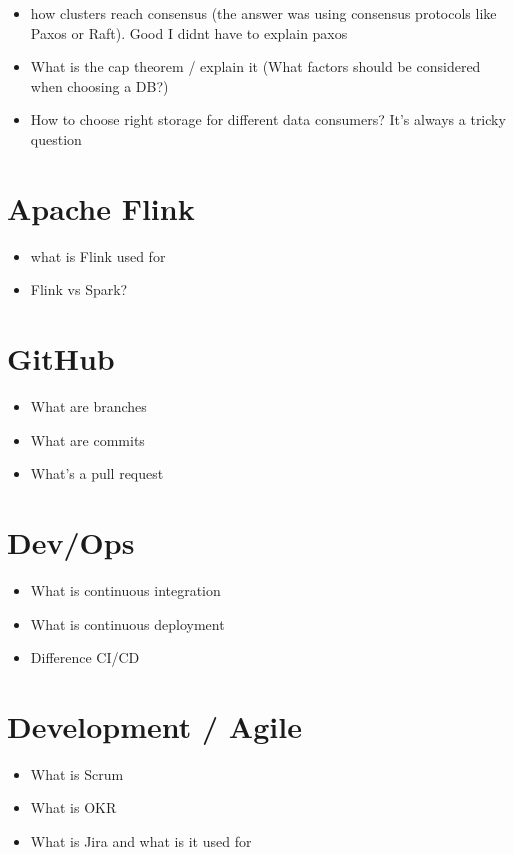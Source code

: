 \documentclass[12pt, numbers=noenddot]{scrreprt} %
\begin{document}
\begin{itemize}
\item how clusters reach consensus (the answer was using consensus protocols like Paxos or Raft). Good I didnt have to explain paxos
\item What is the cap theorem / explain it (What factors should be considered when choosing a DB?)
\item How to choose right storage for different data consumers? It’s always a tricky question
\end{itemize}

\section*{Apache Flink}

\begin{itemize}
\item what is Flink used for
\item Flink vs Spark?
\end{itemize}

\section*{GitHub}

\begin{itemize}
\item What are branches
\item What are commits
\item What's a pull request
\end{itemize}

\section*{Dev/Ops}

\begin{itemize}
\item What is continuous integration
\item What is continuous deployment
\item Difference CI/CD
\end{itemize}

\section*{Development / Agile}

\begin{itemize}
\item What is Scrum
\item What is OKR
\item What is Jira and what is it used for
\end{itemize}
\end{document}
